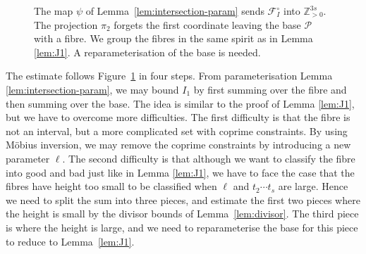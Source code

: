 \begin{figure}[ht]
{%
}
\caption{The map \(\psi\) of Lemma~\ref{lem:intersection-param} sends \(\mathscr{F}_I^\circ\)
into \(\mathbb{Z}_{>0}^{3s}\).  The projection \(\pi_2\) forgets the first coordinate
 leaving the base \(\mathscr{P}\) with a fibre.
We group the fibres in the same spirit as in Lemma \ref{lem:J1}. A reparameterisation of the base is needed.}
\label{fig:I1}
\end{figure}

The estimate follows Figure~\ref{fig:I1} in four steps.
From parameterisation Lemma \ref{lem:intersection-param}, we may bound $I_1$
by first summing over the fibre and then summing over the base.
The idea is similar to the proof of Lemma \ref{lem:J1}, but we have to overcome
more difficulties.
The first difficulty is that the fibre is not an interval, but a more complicated set with coprime constraints.
By using M\"obius inversion, we may remove the coprime constraints by introducing a new parameter $\ell$.
The second difficulty is that although we want to classify the fibre into good and bad just like in Lemma \ref{lem:J1}, we have to face the case that the 
fibres have height too small to be classified when $\ell$ and $t_2\cdots t_s$ are large.
Hence we need to split the sum into three pieces, and estimate the first two pieces where the height is small by the divisor bounds of Lemma~\ref{lem:divisor}.
The third piece is where the height is large, and we need to reparameterise the base for this piece to reduce to Lemma~\ref{lem:J1}.
